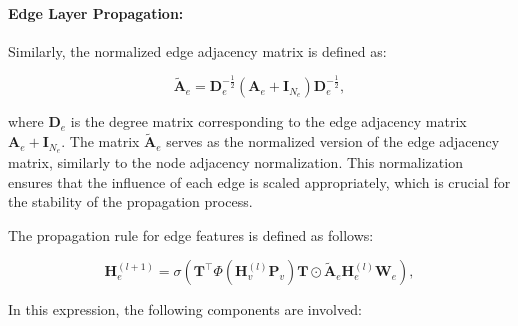 \paragraph{Edge Layer Propagation:}

Similarly, the normalized edge adjacency matrix is defined as:

\begin{equation}
    \tilde{\mathbf{A}}_e = \mathbf{D}_e^{-\frac{1}{2}} \left(\mathbf{A}_e + \mathbf{I}_{N_e}\right) \mathbf{D}_e^{-\frac{1}{2}},
    \label{eq:normalized_edge_adjacency}
\end{equation}


\noindent where \( \mathbf{D}_e \) is the degree matrix corresponding to the edge adjacency matrix \( \mathbf{A}_e + \mathbf{I}_{N_e} \). The matrix \( \tilde{\mathbf{A}}_e \) serves as the normalized version of the edge adjacency matrix, similarly to the node adjacency normalization. This normalization ensures that the influence of each edge is scaled appropriately, which is crucial for the stability of the propagation process.

The propagation rule for edge features is defined as follows:


\begin{equation}
    \mathbf{H}^{(l+1)}_e = \sigma\left(\mathbf{T}^\top \Phi\left(\mathbf{H}^{(l)}_v \mathbf{P}_v\right) \mathbf{T} \odot \tilde{\mathbf{A}}_e \mathbf{H}^{(l)}_e \mathbf{W}_e\right),
\end{equation}

In this expression, the following components are involved:

